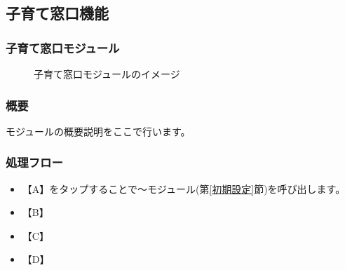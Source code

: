 \documentclass[a4j]{jarticle}
\begin{document}
\subsection{子育て窓口機能}
\subsubsection{子育て窓口モジュール\label{子育て窓口}} %
\begin{figure}[H]
    \begin{center}
    \caption {子育て窓口モジュールのイメージ}
    \label{functionselection}
    \end{center}
\end{figure}
\subsubsection*{概要}
モジュールの概要説明をここで行います。
\subsubsection*{処理フロー}
\begin{itemize}
\item 【A】をタップすることで～モジュール(第\ref{初期設定}節)を呼び出します。%
\item 【B】
\item 【C】
\item 【D】
\end{itemize}
\end{document}
